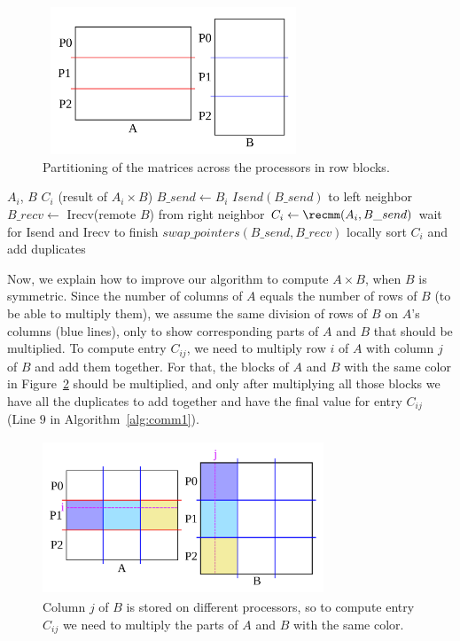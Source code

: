 \begin{figure}[tbh]
 \centering
 \includegraphics[width=7.8cm,height=4.4cm]{./figures/partition2.pdf}
 \caption{Partitioning of the matrices across the processors in row blocks.}
 \label{fig:partition}
\end{figure}

\begin{algorithm}[H] 
  \caption{$C_i = A_i \times B$}
  \begin{algorithmic}[1]
    \Require $A_i$, $B$
    \Ensure  $C_i$ (result of $A_i \times B$)
    \State $B\_send \leftarrow B_i$
      \State $Isend(B\_send)$ to left neighbor
      \State $B\_recv \leftarrow$ Irecv(remote $B$) from right neighbor
      \State $C_{i} \leftarrow \recmm(A_i, B\_send)$ 
      \State wait for Isend and Irecv to finish
      \State $swap\_pointers(B\_send,B\_recv)$
    \EndFor
    \State locally sort $C_i$ and add duplicates
  \end{algorithmic}
  \label{alg:comm1} 
\end{algorithm}

Now, we explain how to improve our algorithm to compute $A \times B$, when $B$ is symmetric. Since the number of columns of $A$ equals the number of rows of $B$ (to be able to multiply them), we assume the same division of rows of $B$ on $A$'s columns (blue lines), only to show corresponding parts of $A$ and $B$ that should be multiplied. To compute entry $C_{ij}$, we need to multiply row $i$ of $A$ with column $j$ of $B$ and add them together.
For that, the blocks of $A$ and $B$ with the same color in Figure~\ref{fig:partition3} should be multiplied, and only after multiplying all those blocks we have all the duplicates to add together and have the final value for entry $C_{ij}$ (Line $9$ in Algorithm~\ref{alg:comm1}).

\begin{figure}[tbh]
    \centering
    \includegraphics[width=8.4cm,height=4.6cm]{./figures/partition3.pdf}
    \caption{Column $j$ of $B$ is stored on different processors, so to compute entry $C_{ij}$ we need to multiply the parts of $A$ and $B$ with the same color.}
    \label{fig:partition3}
\end{figure}

